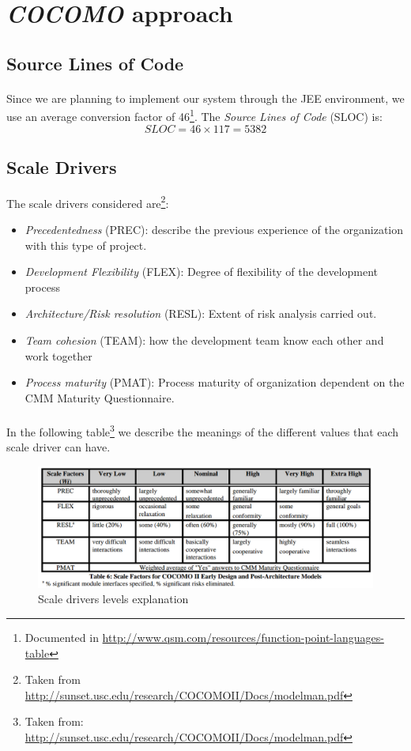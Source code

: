 \section{\textit{COCOMO} approach}
\subsection{Source Lines of Code}
\paragraph{}Since we are planning to implement our system through the JEE environment, we use an average conversion factor of 46\footnote{Documented in \url{http://www.qsm.com/resources/function-point-languages-table}}. The \textit{Source Lines of Code} (SLOC) is: $$SLOC = 46 \times 117 = 5382$$

\subsection{Scale Drivers}
The scale drivers considered are\footnote{Taken from \url{http://sunset.usc.edu/research/COCOMOII/Docs/modelman.pdf}}:
\begin{itemize}
\item \textit{Precedentedness} (PREC): describe the previous experience of the organization with this type of project.
\item \textit{Development Flexibility} (FLEX): Degree of flexibility of the development process
\item \textit{Architecture/Risk resolution} (RESL): Extent of risk analysis carried out.
\item \textit{Team cohesion} (TEAM): how the development team know each other and work together
\item \textit{Process maturity} (PMAT): Process maturity of organization dependent on the CMM Maturity Questionnaire.
\end{itemize}
\paragraph{}In the following table\footnote{Taken from: \url{http://sunset.usc.edu/research/COCOMOII/Docs/modelman.pdf}} we describe the meanings of the different values that each scale driver can have.
\begin{figure}[H]
\centering
\includegraphics[trim= +70 0 0 0, scale = 0.45]{Size_Cost_Effort/scaleDriversTable}
\caption{Scale drivers levels explanation}
\end{figure}
